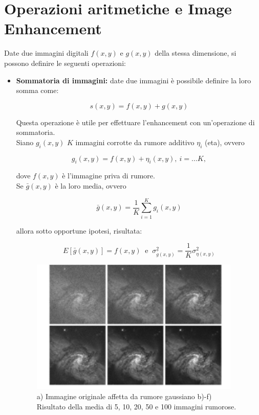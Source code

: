 \section{Operazioni aritmetiche e Image Enhancement}

Date due immagini digitali $f(x,y)$ e $g(x,y)$ della stessa dimensione, si
possono definire le seguenti operazioni:


\begin{itemize}
    \item \textbf{Sommatoria di immagini:} date due immagini è possibile
          definire la loro somma come:

          $$
              s(x,y) = f(x,y) + g(x,y)
          $$

          Questa operazione è utile per effettuare l'enhancement con
          un'operazione di sommatoria.\\

          Siano $g_i(x,y)$ $K$ immagini corrotte da rumore additivo $\eta_i$
          (eta), ovvero

          $$
              g_i(x,y) = f(x,y) + \eta_i(x,y), \ i=...K,
          $$

          dove $f(x,y)$ è l'immagine priva di rumore.\\
          Se $\bar{g}(x,y)$ è la loro media, ovvero

          $$
              \bar{g}(x,y)=\frac{1}{K} \sum_{i=1}^{K}g_i(x,y)
          $$

          allora sotto opportune ipotesi, risultata:

          $$
              E\left[\bar{g}(x,y)\right] = f(x,y) \ \text{ e } \ \sigma^2_{\bar{g}(x,y)}=\frac{1}{K}\sigma^2_{\eta(x,y)}
          $$

          \begin{figure}[H]
              \centering
              \includegraphics[width=10cm, keepaspectratio]{capitoli/immagini/imgs/sommatoria-immagini.png}
              \caption{a) Immagine originale affetta da rumore gaussiano b)-f)
                  Risultato della media di 5, 10, 20, 50 e 100 immagini
                  rumorose.}
          \end{figure}


\end{itemize}
